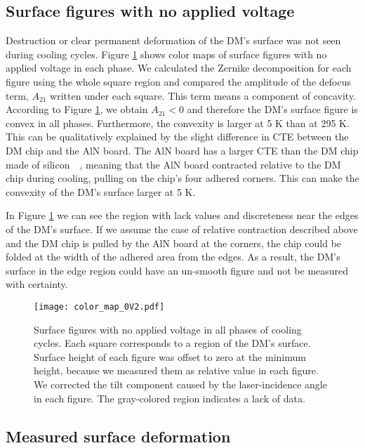 \documentclass[a4paper]{article}
\begin{document}
\subsection{Surface figures with no applied voltage}
\label{no applied-voltages}
Destruction or clear permanent deformation of the DM's surface was not seen during cooling cycles. Figure \ref{color_map_0V} shows color maps of surface figures with no applied voltage in each phase. We calculated the Zernike decomposition for each figure using the whole square region and compared the amplitude of the defocus term, $A_{21}$ written under each square. This term means a component of concavity. According to Figure \ref{color_map_0V}, we obtain $A_{21} < 0$ and therefore the DM's surface figure is convex in all phases. Furthermore, the convexity is larger at 5 K than at 295 K. This can be qualitatively explained by the slight difference in CTE between the DM chip and the AlN board. The AlN board has a larger CTE than the DM chip made of silicon~\cite{Si}~\cite{AlN}, meaning that the AlN board contracted relative to the DM chip during cooling, pulling on the chip's four adhered corners. This can make the convexity of the DM's surface larger at 5 K.

In Figure \ref{color_map_0V} we can see the region with lack values and discreteness near the edges of the DM's surface. If we assume the case of relative contraction described above and the DM chip is pulled by the AlN board at the corners, the chip could be folded at the width of the adhered area from the edges. As a result, the DM's surface in the edge region could have an un-smooth figure and not be measured with certainty. 

\begin{figure}[htbp]
\centering
\texttt{[image: color\_map\_0V2.pdf]}
\caption{Surface figures with no applied voltage in all phases of cooling cycles. Each square corresponds to a region of the DM's surface. Surface height of each figure was offset to zero at the minimum height, because we measured them as relative value in each figure. We corrected the tilt component caused by the laser-incidence angle in each figure. The gray-colored region indicates a lack of data.}
\label{color_map_0V}
\end{figure}

\subsection{Measured surface deformation}
\label{deformation}
\end{document}
